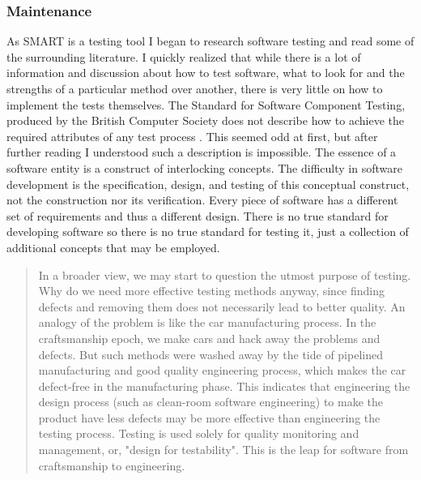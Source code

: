 \documentclass[a4paper, 11pt, titlepage]{article}
\begin{document}
\subsubsection{Maintenance}
As SMART is a testing tool I began to research software testing and read some of the surrounding literature. I quickly realized that while there is a lot of information and discussion about how to test software, what to look for and the strengths of a particular method over another, there is very little on how to implement the tests themselves. The Standard for Software Component Testing, produced by the British Computer Society does not describe how to achieve the required attributes of any test process \cite{BCS paper, 1.5.6}. This seemed odd at first, but after further reading I understood such a description is impossible. The essence of a software entity is a construct of interlocking concepts. The difficulty in software development is the specification, design, and testing of this conceptual construct, not the construction nor its verification. \cite{No Silver Bullet, second section i guess} Every piece of software has a different set of requirements and thus a different design. There is no true standard for developing software so there is no true standard for testing it, just a collection of additional concepts that may be employed. 
\begin{quote}
In a broader view, we may start to question the utmost purpose of testing. Why do we need more effective testing methods anyway, since finding defects and removing them does not necessarily lead to better quality. An analogy of the problem is like the car manufacturing process. In the craftsmanship epoch, we make cars and hack away the problems and defects. But such methods were washed away by the tide of pipelined manufacturing and good quality engineering process, which makes the car defect-free in the manufacturing phase. This indicates that engineering the design process (such as clean-room software engineering) to make the product have less defects may be more effective than engineering the testing process. Testing is used solely for quality monitoring and management, or, "design for testability". This is the leap for software from craftsmanship to engineering.
\end{quote} \cite{Software testing Carnegie Mellon University}
\end{document}
